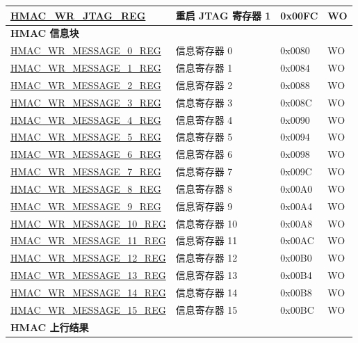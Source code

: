 \begin{longtable}{ | p{6cm} | p{7.2cm} | p{1.3cm} | p{1cm} | }
\\ \hline
\hyperref[regdesc:HMACWRJTAGREG]{HMAC\_WR\_JTAG\_REG} & 重启 JTAG 寄存器 1 & 0x00FC & WO
\\ \hline
\multicolumn{4}{|l|}{\textbf{HMAC 信息块}} \\ \hline
\hyperref[regdesc:HMACWRMESSAGENREG]{HMAC\_WR\_MESSAGE\_0\_REG} & 信息寄存器 0 & 0x0080 & WO \\ \hline
\hyperref[regdesc:HMACWRMESSAGENREG]{HMAC\_WR\_MESSAGE\_1\_REG} & 信息寄存器 1 & 0x0084 & WO \\ \hline
\hyperref[regdesc:HMACWRMESSAGENREG]{HMAC\_WR\_MESSAGE\_2\_REG} & 信息寄存器 2 & 0x0088 & WO \\ \hline
\hyperref[regdesc:HMACWRMESSAGENREG]{HMAC\_WR\_MESSAGE\_3\_REG} & 信息寄存器 3 & 0x008C & WO \\ \hline
\hyperref[regdesc:HMACWRMESSAGENREG]{HMAC\_WR\_MESSAGE\_4\_REG} & 信息寄存器 4 & 0x0090 & WO \\ \hline
\hyperref[regdesc:HMACWRMESSAGENREG]{HMAC\_WR\_MESSAGE\_5\_REG} & 信息寄存器 5 & 0x0094 & WO \\ \hline
\hyperref[regdesc:HMACWRMESSAGENREG]{HMAC\_WR\_MESSAGE\_6\_REG} & 信息寄存器 6 & 0x0098 & WO \\ \hline
\hyperref[regdesc:HMACWRMESSAGENREG]{HMAC\_WR\_MESSAGE\_7\_REG} & 信息寄存器 7 & 0x009C & WO \\ \hline
\hyperref[regdesc:HMACWRMESSAGENREG]{HMAC\_WR\_MESSAGE\_8\_REG} & 信息寄存器 8 & 0x00A0 & WO \\ \hline
\hyperref[regdesc:HMACWRMESSAGENREG]{HMAC\_WR\_MESSAGE\_9\_REG} & 信息寄存器 9 & 0x00A4 & WO \\ \hline
\hyperref[regdesc:HMACWRMESSAGENREG]{HMAC\_WR\_MESSAGE\_10\_REG} & 信息寄存器 10 & 0x00A8 & WO \\ \hline
\hyperref[regdesc:HMACWRMESSAGENREG]{HMAC\_WR\_MESSAGE\_11\_REG} & 信息寄存器 11 & 0x00AC & WO \\ \hline
\hyperref[regdesc:HMACWRMESSAGENREG]{HMAC\_WR\_MESSAGE\_12\_REG} & 信息寄存器 12 & 0x00B0 & WO \\ \hline
\hyperref[regdesc:HMACWRMESSAGENREG]{HMAC\_WR\_MESSAGE\_13\_REG} & 信息寄存器 13 & 0x00B4 & WO \\ \hline
\hyperref[regdesc:HMACWRMESSAGENREG]{HMAC\_WR\_MESSAGE\_14\_REG} & 信息寄存器 14 & 0x00B8 & WO \\ \hline
\hyperref[regdesc:HMACWRMESSAGENREG]{HMAC\_WR\_MESSAGE\_15\_REG} & 信息寄存器 15 & 0x00BC & WO \\ \hline
\multicolumn{4}{|l|}{\textbf{HMAC 上行结果}} \\ \hline

\end{longtable}

